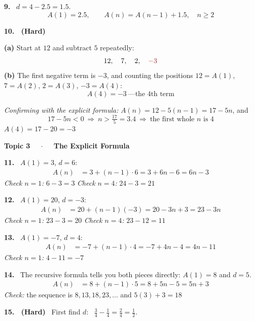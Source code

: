 \documentclass[11pt]{article}
\newcommand{\ans}[1]{\boxed{#1}}
\newcommand{\mneg}[1]{\textcolor{crim}{#1}}
\newcommand{\keyhead}[1]{%
  \par\vspace{9pt}\noindent
  \begin{tcolorbox}[colback=violet!12,colframe=violet,arc=2pt,boxrule=0pt,
    leftrule=3.2pt,left=8pt,right=8pt,top=3pt,bottom=3pt]
  {\color{violet}\bfseries #1}
  \end{tcolorbox}\par\vspace{2pt}}
\begin{document}
\vspace{3pt}
\textbf{9.} \ $d=4-2.5=1.5$.
\[
\ans{A(1)=2.5, \qquad A(n)=A(n-1)+1.5, \quad n\ge2}
\]

\vspace{4pt}
\textbf{10. \ (Hard)}

\vspace{2pt}
\textbf{(a)} Start at $12$ and subtract $5$ repeatedly:
\[
12,\quad 7,\quad 2,\quad \mneg{-3}
\]
\textbf{(b)} The first negative term is $-3$, and counting the positions
$12=A(1)$, $7=A(2)$, $2=A(3)$, $-3=A(4)$:
\[
\ans{A(4)=-3 \ \text{---the 4th term}}
\]

\vspace{2pt}
\emph{Confirming with the explicit formula:} $A(n)=12-5(n-1)=17-5n$, and
\[
17-5n<0 \ \Longrightarrow\ n>\tfrac{17}{5}=3.4 \ \Longrightarrow\ \text{the first whole } n \text{ is } 4
\]
$A(4)=17-20=-3$ 

\keyhead{Topic 3 \ \ $\cdot$ \ \ The Explicit Formula}

\textbf{11.} \ $A(1)=3$, $d=6$:
\begin{align*}
A(n) &= 3+(n-1)\cdot 6 = 3+6n-6 = \ans{6n-3}
\end{align*}
\emph{Check $n=1$:} $6-3=3$  \quad \emph{Check $n=4$:} $24-3=21$ 

\vspace{3pt}
\textbf{12.} \ $A(1)=20$, $d=-3$:
\begin{align*}
A(n) &= 20+(n-1)(-3) = 20-3n+3 = \ans{23-3n}
\end{align*}
\emph{Check $n=1$:} $23-3=20$  \quad \emph{Check $n=4$:} $23-12=11$ 

\vspace{3pt}
\textbf{13.} \ $A(1)=-7$, $d=4$:
\begin{align*}
A(n) &= -7+(n-1)\cdot4 = -7+4n-4 = \ans{4n-11}
\end{align*}
\emph{Check $n=1$:} $4-11=-7$ 

\vspace{3pt}
\textbf{14.} \ The recursive formula tells you both pieces directly: $A(1)=8$ and $d=5$.
\begin{align*}
A(n) &= 8+(n-1)\cdot5 = 8+5n-5 = \ans{5n+3}
\end{align*}
\emph{Check:} the sequence is $8,13,18,23,\ldots$ and $5(3)+3=18$ 

\vspace{4pt}
\textbf{15. \ (Hard)} \ First find $d$: \ $\tfrac34-\tfrac14=\tfrac24=\tfrac12$.
\end{document}
